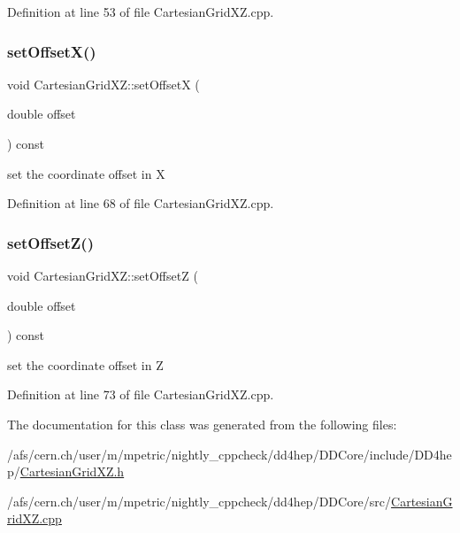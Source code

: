 Definition at line 53 of file Cartesian\+Grid\+X\+Z.\+cpp.

\hypertarget{class_d_d4hep_1_1_geometry_1_1_cartesian_grid_x_z_ac17d9d05aa52b82b9e0a864a94b1fd57}{}\label{class_d_d4hep_1_1_geometry_1_1_cartesian_grid_x_z_ac17d9d05aa52b82b9e0a864a94b1fd57} 
\subsubsection{\texorpdfstring{set\+Offset\+X()}{setOffsetX()}}
{\footnotesize\ttfamily void Cartesian\+Grid\+X\+Z\+::set\+OffsetX (\begin{DoxyParamCaption}\item[{double}]{offset }\end{DoxyParamCaption}) const}



set the coordinate offset in X 



Definition at line 68 of file Cartesian\+Grid\+X\+Z.\+cpp.

\hypertarget{class_d_d4hep_1_1_geometry_1_1_cartesian_grid_x_z_a94b1655c1d03dd377a04151350aeacbd}{}\label{class_d_d4hep_1_1_geometry_1_1_cartesian_grid_x_z_a94b1655c1d03dd377a04151350aeacbd} 
\subsubsection{\texorpdfstring{set\+Offset\+Z()}{setOffsetZ()}}
{\footnotesize\ttfamily void Cartesian\+Grid\+X\+Z\+::set\+OffsetZ (\begin{DoxyParamCaption}\item[{double}]{offset }\end{DoxyParamCaption}) const}



set the coordinate offset in Z 



Definition at line 73 of file Cartesian\+Grid\+X\+Z.\+cpp.



The documentation for this class was generated from the following files\+:\begin{DoxyCompactItemize}
\item 
/afs/cern.\+ch/user/m/mpetric/nightly\+\_\+cppcheck/dd4hep/\+D\+D\+Core/include/\+D\+D4hep/\hyperlink{_d_d_core_2include_2_d_d4hep_2_cartesian_grid_x_z_8h}{Cartesian\+Grid\+X\+Z.\+h}\item 
/afs/cern.\+ch/user/m/mpetric/nightly\+\_\+cppcheck/dd4hep/\+D\+D\+Core/src/\hyperlink{_d_d_core_2src_2_cartesian_grid_x_z_8cpp}{Cartesian\+Grid\+X\+Z.\+cpp}\end{DoxyCompactItemize}
